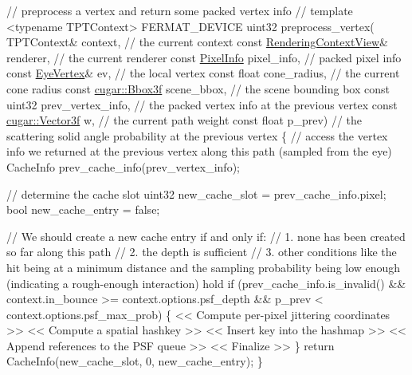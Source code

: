 \begin{DoxyCode}
\textcolor{comment}{// preprocess a vertex and return some packed vertex info}
\textcolor{comment}{//}
\textcolor{keyword}{template} <\textcolor{keyword}{typename} TPTContext>
FERMAT\_DEVICE
uint32 preprocess\_vertex(
         TPTContext&           context,            \textcolor{comment}{// the current context}
   \textcolor{keyword}{const} \hyperlink{struct_rendering_context_view}{RenderingContextView}& renderer,           \textcolor{comment}{// the current renderer}
   \textcolor{keyword}{const} \hyperlink{union_pixel_info}{PixelInfo}             pixel\_info,         \textcolor{comment}{// packed pixel info}
   \textcolor{keyword}{const} \hyperlink{struct_eye_vertex}{EyeVertex}&            ev,                 \textcolor{comment}{// the local vertex}
   \textcolor{keyword}{const} \textcolor{keywordtype}{float}                 cone\_radius,        \textcolor{comment}{// the current cone radius}
   \textcolor{keyword}{const} \hyperlink{structcugar_1_1_bbox}{cugar::Bbox3f}         scene\_bbox,         \textcolor{comment}{// the scene bounding box}
   \textcolor{keyword}{const} uint32                prev\_vertex\_info,   \textcolor{comment}{// the packed vertex info at the previous vertex}
   \textcolor{keyword}{const} \hyperlink{structcugar_1_1_vector}{cugar::Vector3f}       w,                  \textcolor{comment}{// the current path weight}
   \textcolor{keyword}{const} \textcolor{keywordtype}{float}                 p\_prev)             \textcolor{comment}{// the scattering solid angle probability at the
       previous vertex}
\{
   \textcolor{comment}{// access the vertex info we returned at the previous vertex along this path (sampled from the eye)}
   CacheInfo prev\_cache\_info(prev\_vertex\_info);

   \textcolor{comment}{// determine the cache slot}
   uint32 new\_cache\_slot = prev\_cache\_info.pixel;
   \textcolor{keywordtype}{bool}   new\_cache\_entry = \textcolor{keyword}{false};
   
   \textcolor{comment}{// We should create a new cache entry if and only if:}
   \textcolor{comment}{//  1. none has been created so far along this path}
   \textcolor{comment}{//  2. the depth is sufficient}
   \textcolor{comment}{//  3. other conditions like the hit being at a minimum distance and the sampling probability being low
       enough (indicating a rough-enough interaction) hold}
   \textcolor{keywordflow}{if} (prev\_cache\_info.is\_invalid() &&
       context.in\_bounce >= context.options.psf\_depth &&
       p\_prev < context.options.psf\_max\_prob)
   \{
       << Compute per-pixel jittering coordinates >>
       << Compute a spatial hashkey >>
       << Insert key into the hashmap >>
       << Append references to the PSF queue >>
       << Finalize >>
   \}
   \textcolor{keywordflow}{return} CacheInfo(new\_cache\_slot, 0, new\_cache\_entry);
\}
\end{DoxyCode}


